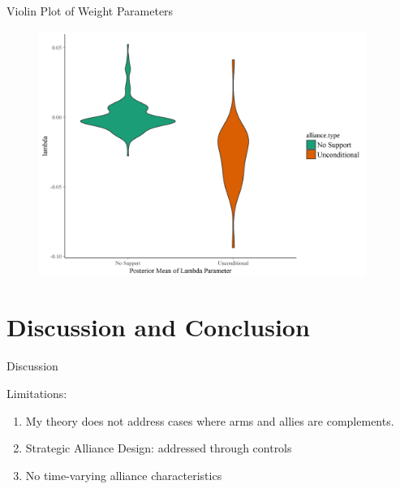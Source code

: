 \documentclass{beamer}
\begin{document}
\begin{frame}{Violin Plot of Weight Parameters}

\begin{figure}
	\centering
		\includegraphics[width=0.95\textwidth]{lambda-box-presentation.png}
	\label{fig:lambdac none-uncond}
\end{figure}


\end{frame}




\section{Discussion and Conclusion}


\begin{frame}{Discussion}

\pause 
Limitations:
\pause
\begin{enumerate}
\item My theory does not address cases where arms and allies are complements. 
\pause
\item Strategic Alliance Design: addressed through controls
\pause 
\item No time-varying alliance characteristics
\end{enumerate}

\end{frame}


\end{document}

